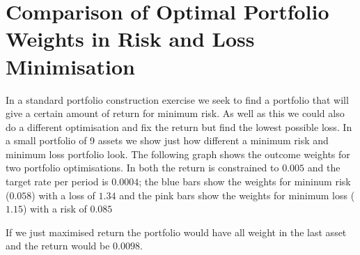\documentclass[12pt]{article}
\begin{document}
\section{Comparison of Optimal Portfolio Weights in Risk and Loss Minimisation}
In a standard portfolio construction exercise we seek to find a portfolio that will 
give a certain amount of return for minimum risk. As well as this we could also do a 
different optimisation and fix the 
return but find the lowest possible loss. In a small portfolio of 9 assets
we show just how different a minimum risk and minimum loss portfolio look.
The following graph shows the outcome weights for two portfolio optimisations. In both the return is 
constrained to $0.005$ and the target rate per period is $0.0004$; the blue bars show the weights
for mininum risk ($0.058$) with a loss of $1.34$ and the pink bars show
the weights for minimum loss ($1.15$) with a risk of $0.085$



If we just maximised return the portfolio would have all weight in the last 
asset and the return would be $0.0098$.
\end{document}
